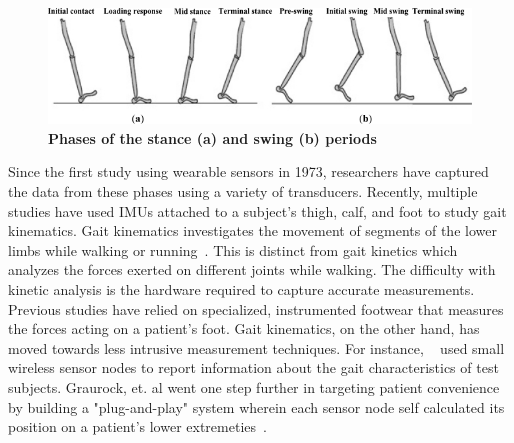 \documentclass[conference]{IEEEtran}
\begin{document}
\begin{figure}[h]
  \centering
  \includegraphics[width=0.9\columnwidth]{figs/phases}
  \caption{{\bf Phases of the stance (a) and swing (b) periods~\cite{gaits} }}
  \label{fig:phases}
\end{figure}

Since the first study using wearable sensors in 1973, researchers have captured the data
from these phases using a variety of transducers. Recently, multiple studies have used
IMUs attached to a subject’s thigh, calf, and foot to study gait kinematics. Gait
kinematics investigates the movement of segments of the lower limbs while walking or
running~\cite{run}. This is distinct from gait kinetics which analyzes the forces exerted on
different joints while walking. The difficulty with kinetic analysis is the hardware
required to capture accurate measurements. Previous studies have relied on specialized,
instrumented footwear that measures the forces acting on a patient’s foot. Gait
kinematics, on the other hand, has moved towards less intrusive measurement techniques.
For instance, ~\cite{walkers} used small wireless sensor nodes to report information about the gait
characteristics of test subjects. Graurock, et. al went one step further in targeting
patient convenience by building a "plug-and-play" system wherein each sensor node self
calculated its position on a patient's lower extremeties~\cite{pairing}.  
\end{document}
